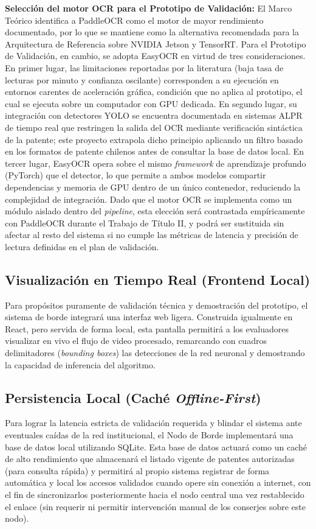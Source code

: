 \textbf{Selección del motor OCR para el Prototipo de Validación:} El Marco Teórico identifica a PaddleOCR como el motor de mayor rendimiento documentado, por lo que se mantiene como la alternativa recomendada para la Arquitectura de Referencia sobre NVIDIA Jetson y TensorRT. Para el Prototipo de Validación, en cambio, se adopta EasyOCR en virtud de tres consideraciones. En primer lugar, las limitaciones reportadas por la literatura (baja tasa de lecturas por minuto y confianza oscilante) corresponden a su ejecución en entornos carentes de aceleración gráfica, condición que no aplica al prototipo, el cual se ejecuta sobre un computador con GPU dedicada. En segundo lugar, su integración con detectores YOLO se encuentra documentada en sistemas ALPR de tiempo real que restringen la salida del OCR mediante verificación sintáctica de la patente; este proyecto extrapola dicho principio aplicando un filtro basado en los formatos de patente chilenos antes de consultar la base de datos local. En tercer lugar, EasyOCR opera sobre el mismo \textit{framework} de aprendizaje profundo (PyTorch) que el detector, lo que permite a ambos modelos compartir dependencias y memoria de GPU dentro de un único contenedor, reduciendo la complejidad de integración. Dado que el motor OCR se implementa como un módulo aislado dentro del \textit{pipeline}, esta elección será contrastada empíricamente con PaddleOCR durante el Trabajo de Título II, y podrá ser sustituida sin afectar al resto del sistema si no cumple las métricas de latencia y precisión de lectura definidas en el plan de validación.

\subsection{Visualización en Tiempo Real (Frontend Local)}
Para propósitos puramente de validación técnica y demostración del prototipo, el sistema de borde integrará una interfaz web ligera. Construida igualmente en React, pero servida de forma local, esta pantalla permitirá a los evaluadores visualizar en vivo el flujo de video procesado, remarcando con cuadros delimitadores (\textit{bounding boxes}) las detecciones de la red neuronal y demostrando la capacidad de inferencia del algoritmo.

\subsection{Persistencia Local (Caché \textit{Offline-First})}
Para lograr la latencia estricta de validación requerida y blindar el sistema ante eventuales caídas de la red institucional, el Nodo de Borde implementará una base de datos local utilizando SQLite. Esta base de datos actuará como un caché de alto rendimiento que almacenará el listado vigente de patentes autorizadas (para consulta rápida) y permitirá al propio sistema registrar de forma automática y local los accesos validados cuando opere sin conexión a internet, con el fin de sincronizarlos posteriormente hacia el nodo central una vez restablecido el enlace (sin requerir ni permitir intervención manual de los conserjes sobre este nodo).

